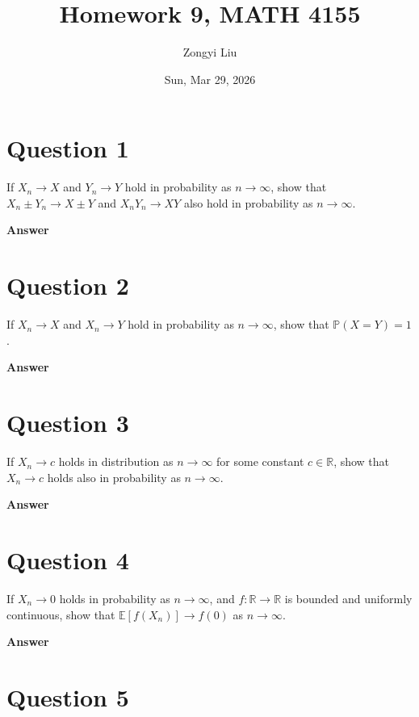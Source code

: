 \documentclass[letterpaper]{article}
\title{Homework 9, MATH 4155}
\author{Zongyi Liu}
\date{Sun, Mar 29, 2026}
\begin{document}
		\maketitle
		\section{Question 1}
		
		If $X_n \to X$ and $Y_n \to Y$ hold in probability as $n \to \infty$, show that $X_n \pm Y_n \to X \pm Y$ and $X_nY_n \to XY$ also hold in probability as $n \to \infty$.
		
		
		
		\textbf{Answer}
		
		\clearpage
		
		\section{Question 2}
		
		If $X_n \to X$ and $X_n \to Y$ hold in probability as $n \to \infty$, show that $\mathbb{P}(X = Y) = 1$.
		
		
		
		\textbf{Answer}
		
		\clearpage
		
		\section{Question 3}
		
		If $X_n \to c$ holds in distribution as $n \to \infty$ for some constant $c \in \mathbb{R}$, show that $X_n \to c$ holds also in probability as $n \to \infty$.
		
		
		
		\textbf{Answer}
		
		\clearpage
		
		\section{Question 4}
		
		If $X_n \to 0$ holds in probability as $n \to \infty$, and $f : \mathbb{R} \to \mathbb{R}$ is bounded and uniformly continuous, show that $\mathbb{E}[f(X_n)] \longrightarrow f(0)$ as $n \to \infty$.
		
		
		
		\textbf{Answer}
		
		\clearpage
		
		\section{Question 5}
		
\end{document}
